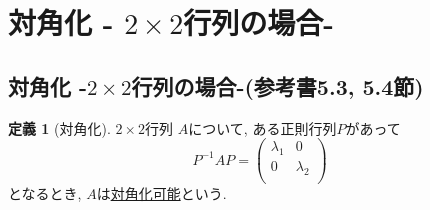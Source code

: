 \documentclass[dvipdfmx,a4paper,11pt]{article}
\theoremstyle{definition}
\newtheorem{dfn}[thm]{定義}
\begin{document}
\newpage

\section{対角化 - $2 \times 2$行列の場合-}
\label{sec-4}
\subsection{対角化 -$2 \times 2$行列の場合-(参考書5.3, 5.4節)}

  \begin{tcolorbox}[
    colback = white,
    colframe = green!35!black,
    fonttitle = \bfseries,
    breakable = true]
    \begin{dfn}[対角化]
    
$2 \times 2$行列
$A$について, ある正則行列$P$があって
$$
P^{-1} A P=
\begin{pmatrix}
\lambda_1& 0 \\
0& \lambda_2\\
\end{pmatrix}
$$
となるとき, $A$は\underline{対角化可能}という.
  \end{dfn}
 \end{tcolorbox}
\end{document}
